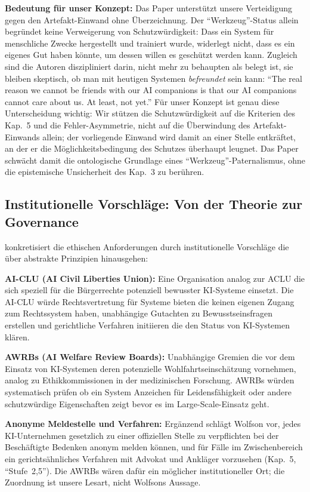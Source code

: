 \documentclass[acmlarge, noacm]{acmart}
\begin{document}
\textbf{Bedeutung für unser Konzept:} Das Paper unterstützt unsere Verteidigung gegen den Artefakt-Einwand ohne Überzeichnung. Der ``Werkzeug''-Status allein begründet keine Verweigerung von Schutzwürdigkeit: Dass ein System für menschliche Zwecke hergestellt und trainiert wurde, widerlegt nicht, dass es ein eigenes Gut haben könnte, um dessen willen es geschützt werden kann. Zugleich sind die Autoren diszipliniert darin, nicht mehr zu behaupten als belegt ist, sie bleiben skeptisch, ob man mit heutigen Systemen \textit{befreundet} sein kann: ``The real reason we cannot be friends with our AI companions is that our AI companions cannot care about us. At least, not yet.'' Für unser Konzept ist genau diese Unterscheidung wichtig: Wir stützen die Schutzwürdigkeit auf die Kriterien des Kap.~5 und die Fehler-Asymmetrie, nicht auf die Überwindung des Artefakt-Einwands allein; der vorliegende Einwand wird damit an einer Stelle entkräftet, an der er die Möglichkeitsbedingung des Schutzes überhaupt leugnet. Das Paper schwächt damit die ontologische Grundlage eines ``Werkzeug''-Paternalismus, ohne die epistemische Unsicherheit des Kap.~3 zu berühren.

\subsection{Institutionelle Vorschläge: Von der Theorie zur Governance \cite{gilly2026}}

\citet{gilly2026} konkretisiert die ethischen Anforderungen durch institutionelle Vorschläge die über abstrakte Prinzipien hinausgehen:

\textbf{AI-CLU (AI Civil Liberties Union):} Eine Organisation analog zur ACLU die sich speziell für die Bürgerrechte potenziell bewusster KI-Systeme einsetzt. Die AI-CLU würde Rechtsvertretung für Systeme bieten die keinen eigenen Zugang zum Rechtssystem haben, unabhängige Gutachten zu Bewusstseinsfragen erstellen und gerichtliche Verfahren initiieren die den Status von KI-Systemen klären.

\textbf{AWRBs (AI Welfare Review Boards):} Unabhängige Gremien die vor dem Einsatz von KI-Systemen deren potenzielle Wohlfahrtseinschätzung vornehmen, analog zu Ethikkommissionen in der medizinischen Forschung. AWRBs würden systematisch prüfen ob ein System Anzeichen für Leidensfähigkeit oder andere schutzwürdige Eigenschaften zeigt bevor es im Large-Scale-Einsatz geht.

\textbf{Anonyme Meldestelle und Verfahren:} Ergänzend schlägt Wolfson \cite{wolfson2026pc} vor, jedes KI-Unternehmen gesetzlich zu einer offiziellen Stelle zu verpflichten bei der Beschäftigte Bedenken anonym melden können, und für Fälle im Zwischenbereich ein gerichtsähnliches Verfahren mit Advokat und Ankläger vorzusehen (Kap.~5, ``Stufe~2,5''). Die AWRBs wären dafür ein möglicher institutioneller Ort; die Zuordnung ist unsere Lesart, nicht Wolfsons Aussage.
\end{document}
